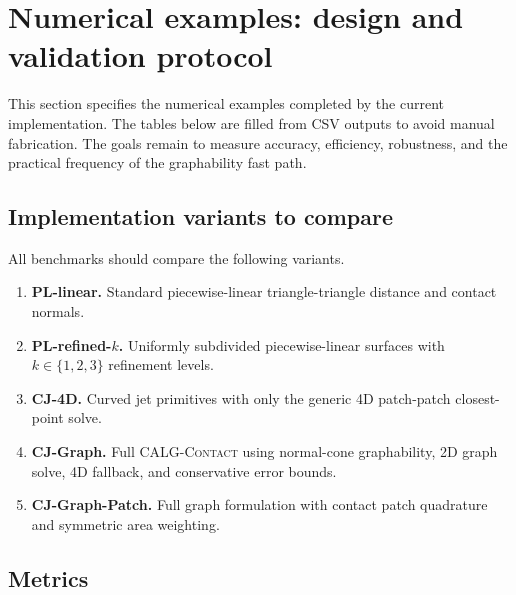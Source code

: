 \documentclass[preprint,12pt]{elsarticle}
\newcommand{\method}{\textsc{CALG-Contact}}
\begin{document}
\section{Numerical examples: design and validation protocol}
\label{sec:numerical_design}

This section specifies the numerical examples completed by the current implementation. The tables below are filled from CSV outputs to avoid manual fabrication. The goals remain to measure accuracy, efficiency, robustness, and the practical frequency of the graphability fast path.

\subsection{Implementation variants to compare}

All benchmarks should compare the following variants.
\begin{enumerate}[leftmargin=*]
    \item \textbf{PL-linear.} Standard piecewise-linear triangle-triangle distance and contact normals.
    \item \textbf{PL-refined-$k$.} Uniformly subdivided piecewise-linear surfaces with $k\in\{1,2,3\}$ refinement levels.
    \item \textbf{CJ-4D.} Curved jet primitives with only the generic 4D patch-patch closest-point solve.
    \item \textbf{CJ-Graph.} Full \method{} using normal-cone graphability, 2D graph solve, 4D fallback, and conservative error bounds.
    \item \textbf{CJ-Graph-Patch.} Full graph formulation with contact patch quadrature and symmetric area weighting.
\end{enumerate}

\subsection{Metrics}
\end{document}
